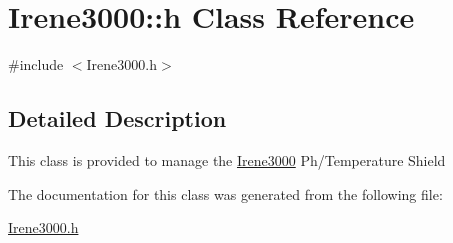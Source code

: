 \hypertarget{class_irene3000_1_1h}{}\section{Irene3000\+:\+:h Class Reference}
\label{class_irene3000_1_1h}


{\ttfamily \#include $<$Irene3000.\+h$>$}



\subsection{Detailed Description}
This class is provided to manage the \hyperlink{class_irene3000}{Irene3000} Ph/\+Temperature Shield 

The documentation for this class was generated from the following file\+:\begin{DoxyCompactItemize}
\item 
\hyperlink{_irene3000_8h}{Irene3000.\+h}\end{DoxyCompactItemize}
